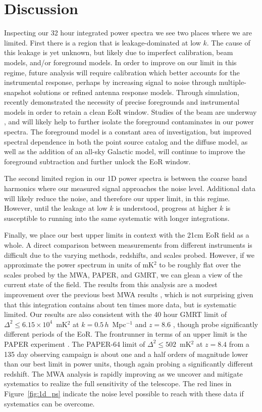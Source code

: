 \documentclass[iop]{emulateapj}
\begin{document}
\section{Discussion}\label{sec:discussion}
Inspecting our 32 hour integrated power spectra we see two places where we are limited. 
First there is a region that is leakage-dominated at low $k$. The cause of this leakage is yet 
unknown, but likely due to imperfect calibration, beam models, and/or foreground models.
In order to improve on our limit in this regime, future analysis will require calibration which 
better accounts for the instrumental response, perhaps by increasing signal to noise 
through multiple-snapshot solutions or refined antenna response models. 
Through simulation, \citealt{Thyagarajan:2016} recently demonstrated the necessity of
 precise foregrounds and instrumental models in order to retain a clean EoR window.
Studies of the 
beam are underway \citep[e.g.][]{Neben:2015}, and will likely help to further isolate the 
foreground contaminates in our power spectra. The foreground model is a constant area of 
investigation, but improved spectral dependence in both the point source catalog and the 
diffuse model, as well as the addition of an all-sky Galactic model, will continue to improve 
the foreground subtraction and further unlock the EoR window.

The second limited region in our 1D power spectra is between the coarse band harmonics 
where our measured signal approaches the noise level. Additional data will likely reduce the 
noise, and therefore our upper limit, in this regime. However, until the leakage at low $k$ is 
understood, progress at higher $k$ is susceptible to running into the same systematic
with longer integrations. 

Finally, we place our best upper limits in context with the 21cm EoR field as a whole. A 
direct comparison between measurements from different instruments is difficult due to the 
varying methods, redshifts, and scales probed. However, if we approximate the power 
spectrum in units of mK$^2$ to be roughly flat over the scales probed by the MWA, PAPER, 
and GMRT, we can glean a view of the current state of the field. The results from this 
analysis are a modest improvement over the previous best MWA results \citep{Dillon:2015}, 
which is not surprising given that this integration contains about ten times more data, but 
is systematic limited. Our results are also consistent with the 
40 hour GMRT limit of $\Delta^2\le6.15\times10^4$~mK$^2$ at $k=0.5\, h$~Mpc$^{-1}$ and $z=8.6$ \citep{Paciga:2013}, though 
probe significantly different periods of the EoR. The frontrunner in terms of an upper limit is 
the PAPER experiment \citep{Ali:2015, Jacobs:2015, Parsons:2014}. The PAPER-64 limit of 
$\Delta^2\le502$~mK$^2$ at $z=8.4$ from a 135 day observing campaign is about one and a half orders of magnitude lower 
than our best limit in power units, though again probing a significantly different redshift. 
The MWA analysis is rapidly improving as we uncover and mitigate systematics to realize
the full sensitivity of the telescope.
The red lines in Figure~\ref{fig:1d_ps} indicate the noise level possible 
to reach with these data if systematics can be overcome.
\end{document}
